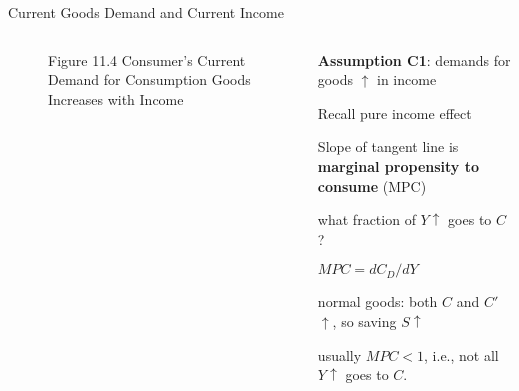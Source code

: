 \documentclass[11pt,aspectratio=169,usenames,dvipsnames]{beamer}
\let\tempone\itemize
\let\temptwo\enditemize
\renewenvironment{itemize}{\tempone\addtolength{\itemsep}{\fill}}{\temptwo}
\begin{document}
\begin{frame}{Current Goods Demand and Current Income}
\label{slide:Current_Goods_Demand_and_Current_Income}
    \begin{columns}
        \begin{column}{0.5\textwidth}
            \begin{figure}
                \caption{\scriptsize Figure 11.4 Consumer’s Current Demand for Consumption Goods Increases with Income}
            \end{figure}
        \end{column}
        \begin{column}{0.5\textwidth}
            \textbf{Assumption C1}: demands for goods $ \uparrow  $ in income
            \begin{itemize}
                \item Recall \alert{pure income effect}
                \item Slope of tangent line is \textbf{marginal propensity to consume} (MPC)
                \begin{itemize}
                    \item what fraction of $ Y \uparrow  $ goes to $ C $?
                    \item $ MPC = d C_{D} / dY $
                \end{itemize}
                \item normal goods: both $ C $ and $ C' $ $ \uparrow  $, so saving $ S \uparrow  $
                \begin{itemize}
                    \item usually $ MPC < 1 $, i.e., not all $ Y \uparrow  $ goes to $ C $.
                \end{itemize}
            \end{itemize}
        \end{column}
    \end{columns}
\end{frame}
\end{document}
